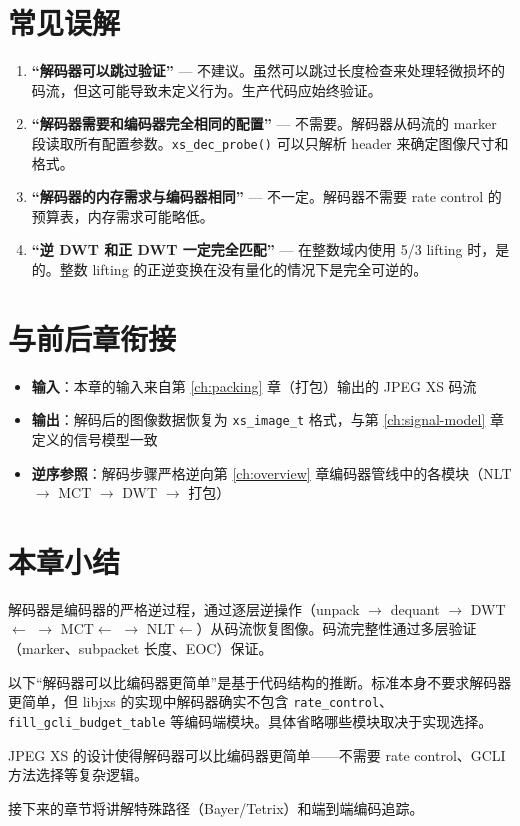 \section{常见误解}

\begin{misunderstanding}
\begin{enumerate}
  \item \textbf{``解码器可以跳过验证''} --- 不建议。虽然可以跳过长度检查来处理轻微损坏的码流，但这可能导致未定义行为。生产代码应始终验证。
  \item \textbf{``解码器需要和编码器完全相同的配置''} --- 不需要。解码器从码流的 marker 段读取所有配置参数。\texttt{xs\_dec\_probe()} 可以只解析 header 来确定图像尺寸和格式。
  \item \textbf{``解码器的内存需求与编码器相同''} --- 不一定。解码器不需要 rate control 的预算表，内存需求可能略低。
  \item \textbf{``逆 DWT 和正 DWT 一定完全匹配''} --- 在整数域内使用 5/3 lifting 时，是的。整数 lifting 的正逆变换在没有量化的情况下是完全可逆的。
\end{enumerate}
\end{misunderstanding}

\section{与前后章衔接}

\begin{itemize}
  \item \textbf{输入}：本章的输入来自第 \ref{ch:packing} 章（打包）输出的 JPEG XS 码流
  \item \textbf{输出}：解码后的图像数据恢复为 \texttt{xs\_image\_t} 格式，与第 \ref{ch:signal-model} 章定义的信号模型一致
  \item \textbf{逆序参照}：解码步骤严格逆向第 \ref{ch:overview} 章编码器管线中的各模块（NLT $\to$ MCT $\to$ DWT $\to$ 打包）
\end{itemize}

\section{本章小结}

解码器是编码器的严格逆过程，通过逐层逆操作（unpack $\to$ dequant $\to$ DWT$\leftarrow$ $\to$ MCT$\leftarrow$ $\to$ NLT$\leftarrow$）从码流恢复图像。码流完整性通过多层验证（marker、subpacket 长度、EOC）保证。

\begin{engineeringnote}
以下``解码器可以比编码器更简单''是基于代码结构的推断。标准本身不要求解码器更简单，但 libjxs 的实现中解码器确实不包含 \texttt{rate\_control}、\texttt{fill\_gcli\_budget\_table} 等编码端模块。具体省略哪些模块取决于实现选择。
\end{engineeringnote}

JPEG XS 的设计使得解码器可以比编码器更简单——不需要 rate control、GCLI 方法选择等复杂逻辑。

接下来的章节将讲解特殊路径（Bayer/Tetrix）和端到端编码追踪。
